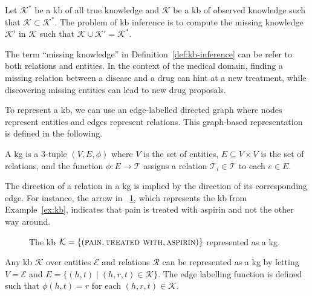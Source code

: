 \begin{definition}\label{def:kb-inference}
  Let $\mathcal{K}^*$ be a \ac{kb} of all true knowledge and $\mathcal{K}$ be a \ac{kb} of observed knowledge such that $\mathcal{K} \subset \mathcal{K}^*$.
  The problem of \ac{kb} inference is to compute the missing knowledge $\mathcal{K}'$ in $\mathcal{K}$ such that $\mathcal{K} \cup \mathcal{K}' = \mathcal{K}^*$.
\end{definition}

The term \enquote{missing knowledge} in Definition~\ref{def:kb-inference} can be refer to both relations and entities.
In the context of the medical domain, finding a missing relation between a disease and a drug can hint at a new treatment, while discovering missing entities can lead to new drug proposals.

To represent a \ac{kb}, we can use an edge-labelled directed graph where nodes represent entities and edges represent relations.
This graph-based representation is defined in the following.

\begin{definition}[\Acl{kg}]
  A \acf{kg} is a 3-tuple $(V, E, \phi)$ where $V$ is the set of entities, $E \subseteq V \times V$ is the set of relations, and the function $\phi \colon E \rightarrow \mathcal{T}$ assigns a relation $\mathcal{T}_i \in \mathcal{T}$ to each $e \in E$.
\end{definition}

The direction of a relation in a \ac{kg} is implied by the direction of its corresponding edge.
For instance, the arrow in \figurename~\ref{fig:one-fact-kb-graph}, which represents the \ac{kb} from Example~\ref{ex:kb}, indicates that pain is treated with aspirin and not the other way around.

\begin{figure}[ht]
  \centering\small
  \caption{The \ac{kb} $\mathcal{K} = \{(\textsc{pain}, \textsc{treated with}, \textsc{aspirin})\}$ represented as a \acl{kg}.}%
  \label{fig:one-fact-kb-graph}
\end{figure}

Any \ac{kb} $\mathcal{K}$ over entities $\mathcal{E}$ and relations $\mathcal{R}$ can be represented as a \ac{kg} by letting $V = \mathcal{E}$ and $E = \{(h, t) \mid (h, r, t) \in \mathcal{K}\}$.
The edge labelling function is defined such that $\phi(h, t) = r$ for each $(h, r, t) \in \mathcal{K}$.

